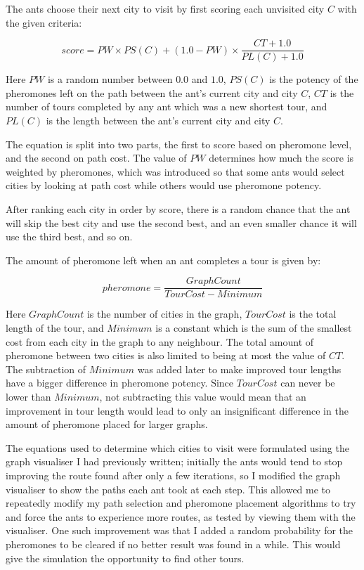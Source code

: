 \documentclass[a4paper,11pt]{article}
\begin{document}
The ants choose their next city to visit by first scoring each unvisited city
$C$ with the given criteria:

$$score = PW \times PS(C)+(1.0 - PW) \times \frac{CT + 1.0}{PL(C) + 1.0}$$

Here $PW$ is a random number between $0.0$ and $1.0$,
$PS(C)$ is the potency of the pheromones left on the path between
the ant's current city and city $C$, $CT$ is the number of tours
completed by any ant which was a new shortest tour, and $PL(C)$ is the
length between the ant's current city and city $C$.

The equation is split into two parts, the first to score based on pheromone
level, and the second on path cost. The value of $PW$ determines how much the
score is weighted by pheromones, which was introduced so that some ants would
select cities by looking at path cost while others would use pheromone potency.

After ranking each city in order by score, there is a random chance that the
ant will skip the best city and use the second best, and an even smaller chance
it will use the third best, and so on.

The amount of pheromone left when an ant completes a tour is given by:

$$pheromone = \frac{GraphCount}{TourCost - Minimum}$$

Here $GraphCount$ is the number of cities in the graph, $TourCost$ is the
total length of the tour, and $Minimum$ is a constant which is the sum of the
smallest cost from each city in the graph to any neighbour. The total amount of
pheromone between two cities is also limited to being at most the value of
$CT$. The subtraction of $Minimum$ was added later to make improved tour
lengths have a bigger difference in pheromone potency. Since $TourCost$ can
never be lower than $Minimum$, not subtracting this value would mean that an 
improvement in tour length would lead to only an insignificant difference in
the amount of pheromone placed for larger graphs.

The equations used to determine which cities to visit were formulated using the
graph visualiser I had previously written; initially the ants would tend to
stop improving the route found after only a few iterations, so I modified the
graph visualiser to show the paths each ant took at each step. This allowed me
to repeatedly modify my path selection and pheromone placement algorithms to
try and force the ants to experience more routes, as tested by viewing them
with the visualiser. One such improvement was that I added a random probability
for the pheromones to be cleared if no better result was found in a while. This
would give the simulation the opportunity to find other tours.
\end{document}
